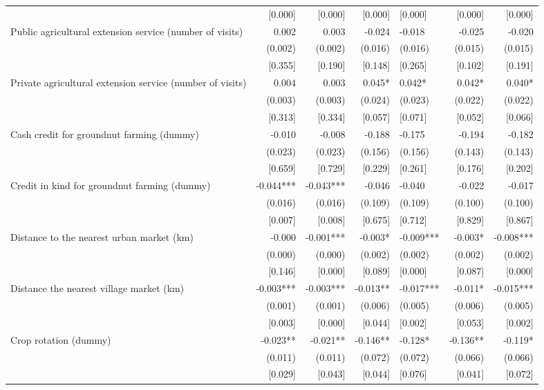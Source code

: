 \documentclass[
]{article}
\begin{document}
\begin{ThreePartTable}
\begin{longtable}[t]{lrrrlrr}
 & {}[0.000] & {}[0.000] & {}[0.000] & {}[0.000] & {}[0.000] & {}[0.000]\\
Public agricultural extension service (number of visits) & 0.002 & 0.003 & -0.024 & -0.018 & -0.025 & -0.020\\
 & (0.002) & (0.002) & (0.016) & (0.016) & (0.015) & (0.015)\\
 & {}[0.355] & {}[0.190] & {}[0.148] & {}[0.265] & {}[0.102] & {}[0.191]\\
Private agricultural extension service (number of visits) & 0.004 & 0.003 & 0.045* & 0.042* & 0.042* & 0.040*\\
 & (0.003) & (0.003) & (0.024) & (0.023) & (0.022) & (0.022)\\
 & {}[0.313] & {}[0.334] & {}[0.057] & {}[0.071] & {}[0.052] & {}[0.066]\\
Cash credit for groundnut farming (dummy) & -0.010 & -0.008 & -0.188 & -0.175 & -0.194 & -0.182\\
 & (0.023) & (0.023) & (0.156) & (0.156) & (0.143) & (0.143)\\
 & {}[0.659] & {}[0.729] & {}[0.229] & {}[0.261] & {}[0.176] & {}[0.202]\\
Credit in kind for groundnut farming (dummy) & -0.044*** & -0.043*** & -0.046 & -0.040 & -0.022 & -0.017\\
 & (0.016) & (0.016) & (0.109) & (0.109) & (0.100) & (0.100)\\
 & {}[0.007] & {}[0.008] & {}[0.675] & {}[0.712] & {}[0.829] & {}[0.867]\\
Distance to the nearest urban market (km) & -0.000 & -0.001*** & -0.003* & -0.009*** & -0.003* & -0.008***\\
 & (0.000) & (0.000) & (0.002) & (0.002) & (0.002) & (0.002)\\
 & {}[0.146] & {}[0.000] & {}[0.089] & {}[0.000] & {}[0.087] & {}[0.000]\\
Distance the nearest village market (km) & -0.003*** & -0.003*** & -0.013** & -0.017*** & -0.011* & -0.015***\\
 & (0.001) & (0.001) & (0.006) & (0.005) & (0.006) & (0.005)\\
 & {}[0.003] & {}[0.000] & {}[0.044] & {}[0.002] & {}[0.053] & {}[0.002]\\
Crop rotation (dummy) & -0.023** & -0.021** & -0.146** & -0.128* & -0.136** & -0.119*\\
 & (0.011) & (0.011) & (0.072) & (0.072) & (0.066) & (0.066)\\
 & {}[0.029] & {}[0.043] & {}[0.044] & {}[0.076] & {}[0.041] & {}[0.072]\\

\end{longtable}
\end{ThreePartTable}
\end{document}
